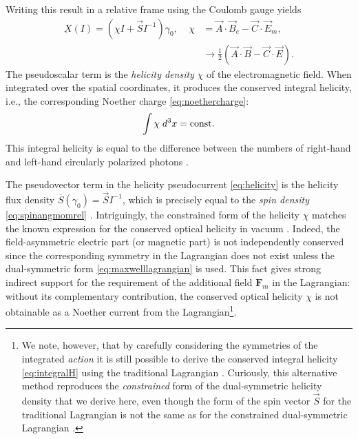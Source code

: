 \documentclass[1p,sort&compress]{elsarticle}
\numberwithin{equation}{section}
\newcommand{\rv}[1]{\vec{#1}}
\newcommand{\bv}[1]{\mathbf{#1}}
\begin{document}
\begin{table}
 \label{tab:canhelicity}
\end{table}

Writing this result in a relative frame using the Coulomb gauge yields
\begin{align}\label{eq:helicity}
  \underbar{X}(I) = (\chi I + \rv{S} I^{-1})\gamma_0,~~~~~
  \chi &= \rv{A}\cdot\rv{B}_e - \rv{C}\cdot\rv{E}_m, \\
  &\to \frac{1}{2}(\rv{A}\cdot\rv{B} - \rv{C}\cdot\rv{E}). \nonumber
\end{align}
The pseudoscalar term is the \emph{helicity density} $\chi$ of the electromagnetic field. When integrated over the spatial coordinates, it produces the conserved integral helicity, i.e., the corresponding Noether charge \eqref{eq:noethercharge}:
\begin{align}\label{eq:integralH}
 \int\chi\;d^3 x = {\rm const}. 
\end{align}
This integral helicity is equal to the difference between the numbers of right-hand and left-hand circularly polarized photons \cite{Calkin1965,Candlin1965,Oconnell1965,Afanasiev1996,Trueba1996,Bliokh2011,Cameron2012b}. 

The pseudovector term in the helicity pseudocurrent \eqref{eq:helicity} is the helicity flux density  $\overline{S}(\gamma_0) = \rv{S} I^{-1}$, which is precisely equal to the \emph{spin density} \eqref{eq:spinangmomrel} \cite{Cameron2012b,Bliokh2013,Cameron2012}. Intriguingly, the constrained form of the helicity $\chi$ matches the known expression for the conserved optical helicity in vacuum \cite{Calkin1965,Afanasiev1996,Trueba1996,Bliokh2011,Cameron2012b,Bliokh2013,Cameron2012}.  Indeed, the field-asymmetric electric part (or magnetic part) is not independently conserved since the corresponding symmetry in the Lagrangian does not exist unless the dual-symmetric form \eqref{eq:maxwelllagrangian} is used.  This fact gives strong indirect support for the requirement of the additional field $\bv{F}_m$ in the Lagrangian: without its complementary contribution, the conserved optical helicity $\chi$ is not obtainable as a Noether current from the Lagrangian\footnote{We note, however, that by carefully considering the symmetries of the integrated \emph{action} it is still possible to derive the conserved integral helicity \eqref{eq:integralH} using the traditional Lagrangian \cite{Calkin1965,Deser1976,Deser1982}.  Curiously, this alternative method reproduces the \emph{constrained} form of the dual-symmetric helicity density that we derive here, even though the form of the spin vector $\rv{S}$ for the traditional Lagrangian is not the same as for the constrained dual-symmetric Lagrangian \cite{Bliokh2013}.}. 
\end{document}
